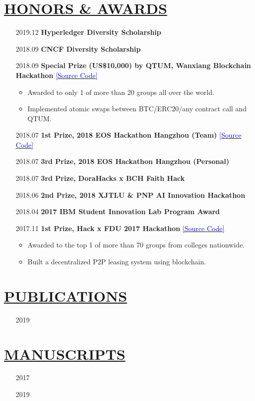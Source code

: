 \documentclass[11pt]{article}
\begin{document}
\section*{\centering\underline{HONORS \& AWARDS}}
\begin{itemize}[noitemsep, nolistsep]
    \item[2019.12]\textbf{Hyperledger Diversity Scholarship}
    \item[2018.09]\textbf{CNCF Diversity Scholarship}
    \item[2018.09]\textbf{Special Prize (US\$10,000) by QTUM, Wanxiang Blockchain Hackathon} \href{https://github.com/PRIEWIENV/QtumSwap}{\textcolor{blue}{[Source Code]}}
        \begin{itemize}[noitemsep, nolistsep]
            \small
            \item Awarded to only 1 of more than 20 groups all over the world. 
            \item Implemented atomic swaps between BTC/ERC20/any contract call and QTUM.
        \end{itemize} 
    \item[2018.07]\textbf{1st Prize, 2018 EOS Hackathon Hangzhou (Team)} \href{https://github.com/Acappella-dream}{\textcolor{blue}{[Source Code]}}
    \item[2018.07]\textbf{3rd Prize, 2018 EOS Hackathon Hangzhou (Personal)}
    \item[2018.07]\textbf{3rd Prize, DoraHacks x BCH Faith Hack}
    \item[2018.06]\textbf{2nd Prize, 2018 XJTLU \& PNP AI Innovation Hackathon}
    \item[2018.04]\textbf{2017 IBM Student Innovation Lab Program Award}
    \item[2017.11]\textbf{1st Prize, Hack x FDU 2017 Hackathon} \href{https://github.com/dexhunter/hackxfdu-DSharing}{\textcolor{blue}{[Source Code]}}
        \begin{itemize}[noitemsep, nolistsep]
            \small
            \item Awarded to the top 1 of more than 70 groups from colleges nationwide.
            \item Built a decentralized P2P leasing system using blockchain. 
        \end{itemize} 
\end{itemize}




\section*{\centering\underline{PUBLICATIONS}}
\begin{itemize}
    \item[2019] 
\end{itemize}
\section*{\centering\underline{MANUSCRIPTS}}
\begin{itemize}
    \item[2017] 
    \item[2019] 
\end{itemize}
\end{document}
